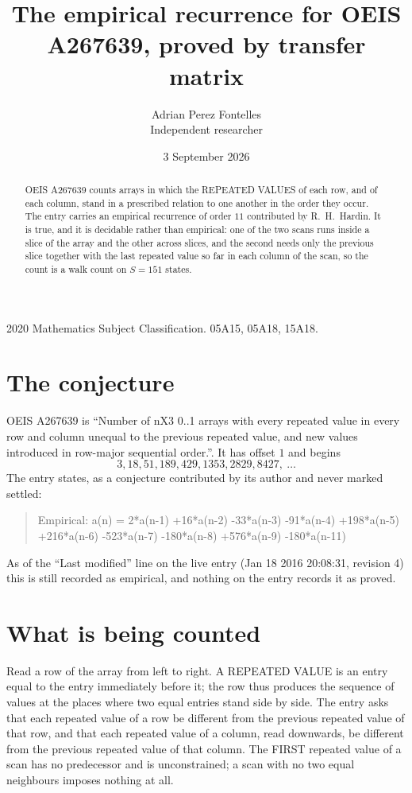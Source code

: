 \documentclass[11pt,a4paper]{article}
\title{The empirical recurrence for OEIS A267639, proved by transfer matrix}
\author{Adrian Perez Fontelles\\ \small Independent researcher}
\date{3 September 2026}
\theoremstyle{plain}
\theoremstyle{definition}
\begin{document}
\maketitle

\begin{abstract}
OEIS A267639 counts arrays in which the REPEATED VALUES of each row, and of each column, stand in a
prescribed relation to one another in the order they occur. The entry carries an empirical
recurrence of order $11$ contributed by R.~H.~Hardin. It is true, and it is decidable
rather than empirical: one of the two scans runs inside a slice of the array and the other
across slices, and the second needs only the previous slice together with the last repeated
value so far in each column of the scan, so the count is a walk count on $S=151$ states.
\end{abstract}

\noindent\small 2020 Mathematics Subject Classification. 05A15, 05A18, 15A18.\normalsize

\section{The conjecture}

OEIS A267639 is ``Number of nX3 0..1 arrays with every repeated value in every row and column unequal to the previous repeated value, and new values introduced in row-major sequential order.''. It has offset $1$ and begins
\[
3, 18, 51, 189, 429, 1353, 2829, 8427,\ \dots
\]
The entry states, as a conjecture contributed by its author and never marked settled:
\begin{quote}
Empirical: a(n) = 2*a(n-1) +16*a(n-2) -33*a(n-3) -91*a(n-4) +198*a(n-5) +216*a(n-6) -523*a(n-7) -180*a(n-8) +576*a(n-9) -180*a(n-11)
\end{quote}
As of the ``Last modified'' line on the live entry (Jan 18 2016 20:08:31, revision 4) this is still
recorded as empirical, and nothing on the entry records it as proved.

\section{What is being counted}

Read a row of the array from left to right. A REPEATED VALUE is an entry equal to the entry
immediately before it; the row thus produces the sequence of values at the places where two
equal entries stand side by side. The entry asks that each repeated value of a row be
different from the previous repeated value of that row, and that each repeated value of a column,
read downwards, be different from the previous repeated value of that column. The FIRST repeated
value of a scan has no predecessor and is unconstrained; a scan with no two equal neighbours
imposes nothing at all.
\end{document}

